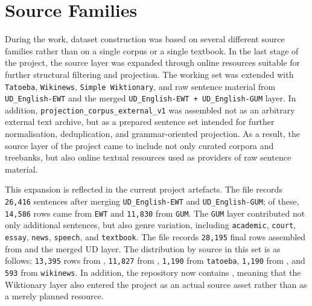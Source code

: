 \documentclass[12pt,a4paper,oneside]{report}
\begin{document}
\section{Source Families}
During the work, dataset construction was based on several different source families rather than on a single corpus or a single textbook. In the last stage of the project, the source layer was expanded through online resources suitable for further structural filtering and projection. The working set was extended with \texttt{Tatoeba}, \texttt{Wikinews}, \texttt{Simple Wiktionary}, and raw sentence material from \texttt{UD\_English-EWT} and the merged \texttt{UD\_English-EWT + UD\_English-GUM} layer. In addition, \texttt{projection\_corpus\_external\_v1} was assembled not as an arbitrary external text archive, but as a prepared sentence set intended for further normalisation, deduplication, and grammar-oriented projection. As a result, the source layer of the project came to include not only curated corpora and treebanks, but also online textual resources used as providers of raw sentence material.

This expansion is reflected in the current project artefacts. The file  records \texttt{26,416} sentences after merging \texttt{UD\_English-EWT} and \texttt{UD\_English-GUM}; of these, \texttt{14,586} rows came from \texttt{EWT} and \texttt{11,830} from \texttt{GUM}. The \texttt{GUM} layer contributed not only additional sentences, but also genre variation, including \texttt{academic}, \texttt{court}, \texttt{essay}, \texttt{news}, \texttt{speech}, and \texttt{textbook}. The file  records \texttt{28,195} final rows assembled from  and the merged UD layer. The distribution by source in this set is as follows: \texttt{13,395} rows from , \texttt{11,827} from , \texttt{1,190} from \texttt{tatoeba}, \texttt{1,190} from , and \texttt{593} from \texttt{wikinews}. In addition, the repository now contains , meaning that the Wiktionary layer also entered the project as an actual source asset rather than as a merely planned resource.
\end{document}
